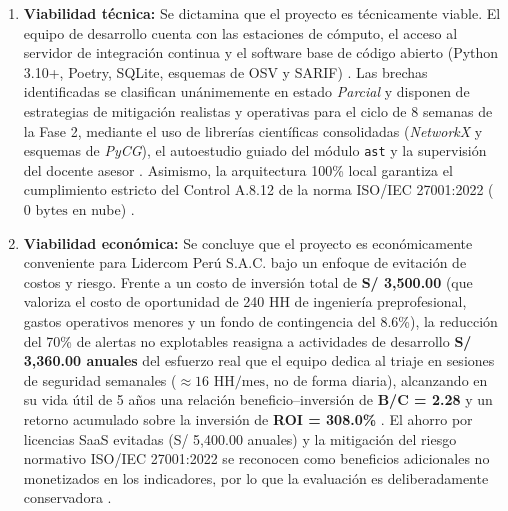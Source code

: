 \begin{enumerate}[leftmargin=1.27cm, label=\alph*)]
    \item \textbf{Viabilidad técnica:} Se dictamina que el proyecto es técnicamente viable. El equipo de desarrollo cuenta con las estaciones de cómputo, el acceso al servidor de integración continua y el software base de código abierto (Python 3.10+, Poetry, SQLite, esquemas de OSV y SARIF) \parencite{torres2026proyecto}. %
    Las brechas identificadas se clasifican unánimemente en estado \textit{Parcial} y disponen de estrategias de mitigación realistas y operativas para el ciclo de 8 semanas de la Fase 2, mediante el uso de librerías científicas consolidadas (\textit{NetworkX} y esquemas de \textit{PyCG}), el autoestudio guiado del módulo \texttt{ast} y la supervisión del docente asesor \parencite{salis2021pycg, hagberg2008exploring, torres2026proyecto}. %
    Asimismo, la arquitectura 100\% local garantiza el cumplimiento estricto del Control A.8.12 de la norma ISO/IEC 27001:2022 ($0\text{ bytes}$ en nube) \parencite{ladisa2023sok, gutierrez2024auditoria}. %

    \item \textbf{Viabilidad económica:} Se concluye que el proyecto es económicamente conveniente para Lidercom Perú S.A.C. bajo un enfoque de evitación de costos y riesgo. Frente a un costo de inversión total de \textbf{S/ 3,500.00} (que valoriza el costo de oportunidad de 240 HH de ingeniería preprofesional, gastos operativos menores y un fondo de contingencia del 8.6\%), la reducción del 70\% de alertas no explotables reasigna a actividades de desarrollo \textbf{S/ 3,360.00 anuales} del esfuerzo real que el equipo dedica al triaje en sesiones de seguridad semanales ($\approx 16\text{ HH/mes}$, no de forma diaria), alcanzando en su vida útil de 5 años una relación beneficio--inversión de \textbf{B/C = 2.28} y un retorno acumulado sobre la inversión de \textbf{ROI = 308.0\%} \parencite{pashchenko2022vuln4real, torres2026proyecto}. %
    El ahorro por licencias SaaS evitadas (S/ 5,400.00 anuales) y la mitigación del riesgo normativo ISO/IEC 27001:2022 se reconocen como beneficios adicionales no monetizados en los indicadores, por lo que la evaluación es deliberadamente conservadora \parencite{ladisa2023sok, gutierrez2024auditoria}. %


\end{enumerate}
